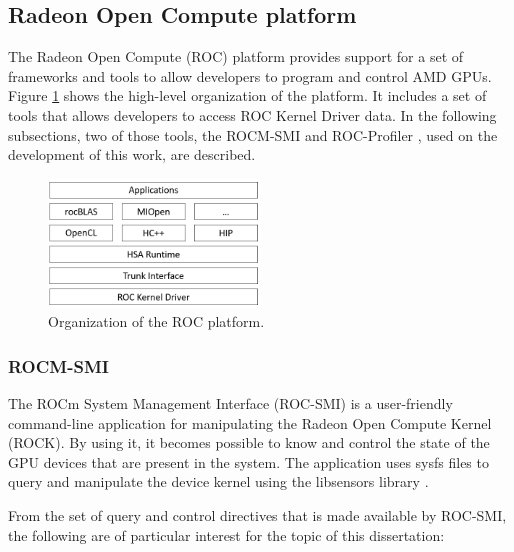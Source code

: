 \subsection{Radeon Open Compute platform}

The Radeon Open Compute (ROC) \cite{noauthor_radeonopencompute/rocm_2019} platform provides support for a set of frameworks and tools to allow developers to program and control AMD GPUs. Figure \ref{fig:rocmplatform} shows the high-level organization of the platform. It includes a set of tools that allows developers to access ROC Kernel Driver data. In the following subsections, two of those tools, the ROCM-SMI \cite{noauthor_radeonopencompute/roc-smi_2019} and ROC-Profiler \cite{noauthor_rocm-developer-tools/rocprofiler_2019}, used on the development of this work, are described.

\begin{figure}[!htb]
  \centering
  \includegraphics[width=0.5\textwidth]{Figures/StateArt/rocStack.png}
  \caption{Organization of the ROC platform.}
  \label{fig:rocmplatform}
\end{figure}

\subsubsection{ROCM-SMI}
The ROCm System Management Interface (ROC-SMI) \cite{noauthor_radeonopencompute/roc-smi_2019} is a user-friendly command-line application for manipulating the Radeon Open Compute Kernel (ROCK). By using it, it becomes possible to know and control the state of the GPU devices that are present in the system. The application uses sysfs files to query and manipulate the device kernel using the libsensors library \cite{noauthor_libsensors3:_nodate}.

From the set of query and control directives that is made available by ROC-SMI, the following are of particular interest for the topic of this dissertation:


